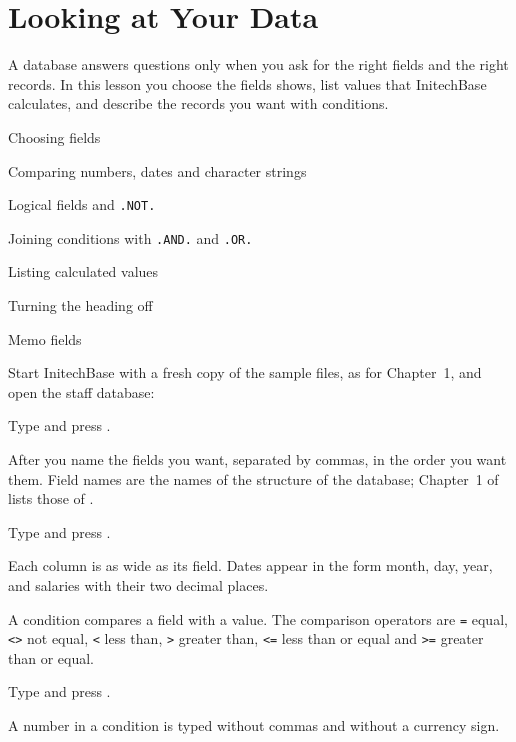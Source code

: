 \chapter{Looking at Your Data}
A database answers questions only when you ask for the right fields and the
right records.  In this lesson you choose the fields  shows, list
values that InitechBase calculates, and describe the records you want with
conditions.

\begin{ChapterCovers}
\item Choosing fields
\item Comparing numbers, dates and character strings
\item Logical fields and \texttt{.NOT.}
\item Joining conditions with \texttt{.AND.} and \texttt{.OR.}
\item Listing calculated values
\item Turning the heading off
\item Memo fields
\end{ChapterCovers}

Start InitechBase with a fresh copy of the sample files, as for Chapter~1, and
open the staff database:
\begin{Steps}
\item Type  and press .
\end{Steps}

After  you name the fields you want, separated by commas, in the
order you want them.  Field names are the names of the structure of the
database; Chapter~1 of  lists those of
.
\begin{Steps}[resume]
\item Type  and press .
\end{Steps}
Each column is as wide as its field.  Dates appear in the form month, day,
year, and salaries with their two decimal places.

A condition compares a field with a value.  The comparison operators are
\texttt{=} equal, \texttt{<>} not equal, \texttt{<} less than, \texttt{>}
greater than, \texttt{<=} less than or equal and \texttt{>=} greater than or
equal.
\begin{Steps}[resume]
\item Type  and press
.
\end{Steps}
A number in a condition is typed without commas and without a currency sign.

